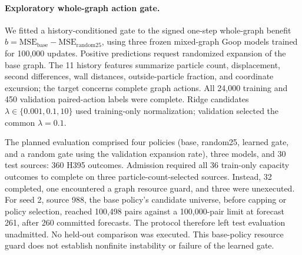 \paragraph{Exploratory whole-graph action gate.}
We fitted a history-conditioned gate to the signed one-step whole-graph
benefit $b=\mathrm{MSE}_{\mathrm{base}}-\mathrm{MSE}_{\mathrm{random25}}$,
using three frozen mixed-graph Goop models trained for 100,000 updates.
Positive predictions request randomized expansion of the base graph.
The 11 history features summarize particle count, displacement,
second differences, wall distances, outside-particle fraction,
and coordinate excursion; the target concerns complete graph actions.
All 24,000 training and 450 validation paired-action labels were complete.
Ridge candidates $\lambda\in\{0.001,0.1,10\}$ used training-only
normalization; validation selected the common $\lambda=0.1$.

The planned evaluation comprised four policies (base, random25, learned
gate, and a random gate using the validation expansion rate), three models, and
30 test sources: 360 H395 outcomes. Admission required all 36 train-only
capacity outcomes to complete on three particle-count-selected sources.
Instead, 32 completed, one encountered a graph resource guard, and three
were unexecuted. For seed 2, source 988, the base policy's candidate
universe, before capping or policy selection, reached 100,498 pairs against
a 100,000-pair limit at forecast
261, after 260 committed forecasts. The protocol therefore left test
evaluation unadmitted. No held-out comparison was executed. This base-policy resource guard
does not establish nonfinite instability or failure of the learned gate.
